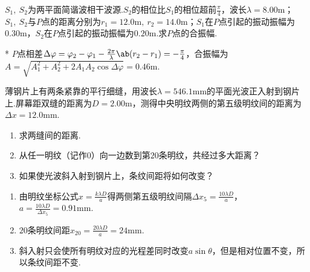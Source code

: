 \begin{problem}[光程和光程差][5]
    $S_1,\ S_2$为两平面简谐波相干波源.$S_2$的相位比$S_1$的相位超前$\frac{\pi}{4}$，波长$\lambda=8.00\mathrm{m}$；$S_1,\ S_2$与$P$点的距离分别为$r_1=12.0\mathrm{m},\ r_2=14.0\mathrm{m}$；$S_1$在$P$点引起的振动振幅为$0.30\mathrm{m}$，$S_2    $在$P$点引起的振动振幅为$0.20\mathrm{m}$.求$P$点的合振幅.
\end{problem}
\begin{solution}*
    $P$点相差$\Delta\varphi=\varphi_2-\varphi_1-\frac{2\pi}{\lambda}\ab(r_2-r_1)=-\frac{\pi}{4}$，合振幅为$A=\sqrt{A_1^2+A_2^2+2A_1A_2\cos{\Delta\varphi}}=0.46\mathrm{m}$.
\end{solution}

\begin{problem}[双缝干涉][10]
    薄钢片上有两条紧靠的平行细缝，用波长$\lambda=546.1\mathrm{mm}$的平面光波正入射到钢片上.屏幕距双缝的距离为$D=2.00\mathrm{m}$，测得中央明纹两侧的第五级明纹间的距离为$\Delta x=12.0\mathrm{mm}$.
    \begin{enumerate}
        \item 求两缝间的距离.
        \item 从任一明纹（记作$0$）向一边数到第$20$条明纹，共经过多大距离？
        \item 如果使光波斜入射到钢片上，条纹间距将如何改变？
    \end{enumerate}
\end{problem}
\begin{solution}
    \begin{enumerate}
        \item 由明纹坐标公式$x=\frac{k\lambda D}{a}$得两侧第五级明纹间隔$\Delta x_5=\frac{10\lambda D}{a}$，$a=\frac{10\lambda D}{\Delta x_5}=0.91\mathrm{mm}$.
        \item $20$条明纹间距$x_{20}=\frac{20\lambda D}{a}=24\mathrm{mm}$.
        \item 斜入射只会使所有明纹对应的光程差同时改变$a\sin{\theta}$，但是相对位置不变，所以条纹间距不变.
    \end{enumerate}
\end{solution}

